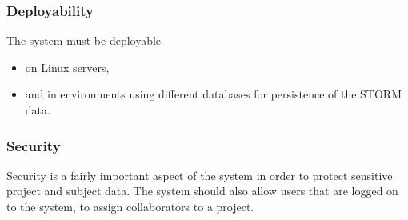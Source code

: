 \subsubsection{Deployability}
The system must be deployable
\begin{itemize}
\item on Linux servers,
\item and in environments using different databases for persistence of the STORM data.
\end{itemize}

\subsubsection{Security}
Security is a fairly important aspect of the system in order to protect sensitive project and subject data.
The system should also allow users that are logged on to the system, to assign collaborators
to a project. 


